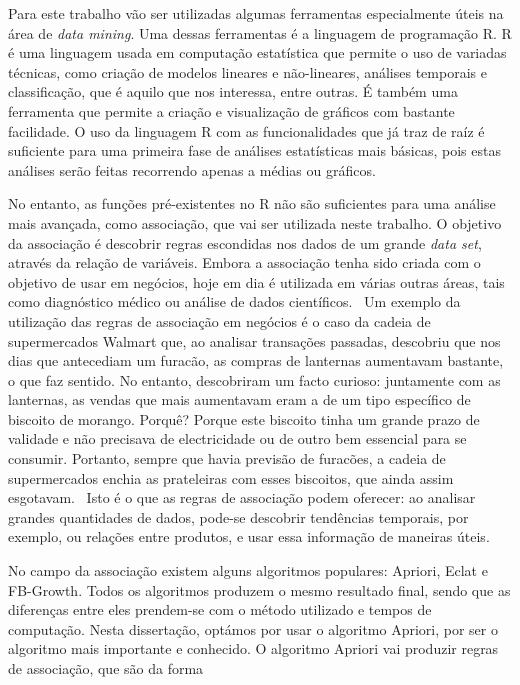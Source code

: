 Para este trabalho vão ser utilizadas algumas ferramentas especialmente úteis na área de \textit{data mining}. Uma dessas ferramentas é a linguagem de programação R. R é uma linguagem usada em computação estatística que permite o uso de variadas técnicas, como criação de modelos lineares e não-lineares, análises temporais e classificação, que é aquilo que nos interessa, entre outras. É também uma ferramenta que permite a criação e visualização de gráficos com bastante facilidade. O uso da linguagem R com as funcionalidades que já traz de raíz é suficiente para uma primeira fase de análises estatísticas mais básicas, pois estas análises serão feitas recorrendo apenas a médias ou gráficos.

No entanto, as funções pré-existentes no R não são suficientes para uma análise mais avançada, como associação, que vai ser utilizada neste trabalho. O objetivo da associação é descobrir regras escondidas nos dados de um grande \textit{data set}, através da relação de variáveis. Embora a associação tenha sido criada com o objetivo de usar em negócios, hoje em dia é utilizada em várias outras áreas, tais como diagnóstico médico ou análise de dados científicos.~\cite{chapter6}
Um exemplo da utilização das regras de associação em negócios é o caso da cadeia de supermercados Walmart que, ao analisar transações passadas, descobriu que nos dias que antecediam um furacão, as compras de lanternas aumentavam bastante, o que faz sentido. No entanto, descobriram um facto curioso: juntamente com as lanternas, as vendas que mais aumentavam eram a de um tipo específico de biscoito de morango. Porquê? Porque este biscoito tinha um grande prazo de validade e não precisava de electricidade ou de outro bem essencial para se consumir. Portanto, sempre que havia previsão de furacões, a cadeia de supermercados enchia as prateleiras com esses biscoitos, que ainda assim esgotavam.~\cite{walmart}
Isto é o que as regras de associação podem oferecer: ao analisar grandes quantidades de dados, pode-se descobrir tendências temporais, por exemplo, ou relações entre produtos, e usar essa informação de maneiras úteis. 

No campo da associação existem alguns algoritmos populares: Apriori, Eclat e FB-Growth. Todos os algoritmos produzem o mesmo resultado final, sendo que as diferenças entre eles prendem-se com o método utilizado e tempos de computação. Nesta dissertação, optámos por usar o algoritmo Apriori, por ser o algoritmo mais importante e conhecido. O algoritmo Apriori vai produzir regras de associação, que são da forma


